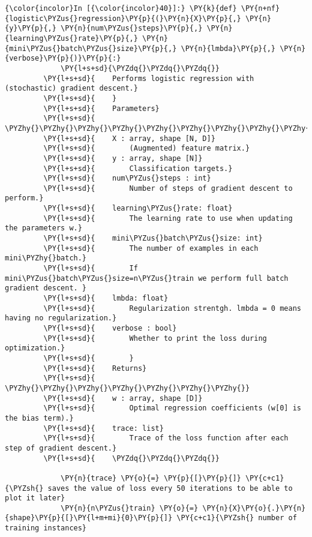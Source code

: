     \begin{Verbatim}[commandchars=\\\{\}]
{\color{incolor}In [{\color{incolor}40}]:} \PY{k}{def} \PY{n+nf}{logistic\PYZus{}regression}\PY{p}{(}\PY{n}{X}\PY{p}{,} \PY{n}{y}\PY{p}{,} \PY{n}{num\PYZus{}steps}\PY{p}{,} \PY{n}{learning\PYZus{}rate}\PY{p}{,} \PY{n}{mini\PYZus{}batch\PYZus{}size}\PY{p}{,} \PY{n}{lmbda}\PY{p}{,} \PY{n}{verbose}\PY{p}{)}\PY{p}{:}
             \PY{l+s+sd}{\PYZdq{}\PYZdq{}\PYZdq{}}
         \PY{l+s+sd}{    Performs logistic regression with (stochastic) gradient descent.}
         \PY{l+s+sd}{    }
         \PY{l+s+sd}{    Parameters}
         \PY{l+s+sd}{    \PYZhy{}\PYZhy{}\PYZhy{}\PYZhy{}\PYZhy{}\PYZhy{}\PYZhy{}\PYZhy{}\PYZhy{}\PYZhy{}}
         \PY{l+s+sd}{    X : array, shape [N, D]}
         \PY{l+s+sd}{        (Augmented) feature matrix.}
         \PY{l+s+sd}{    y : array, shape [N]}
         \PY{l+s+sd}{        Classification targets.}
         \PY{l+s+sd}{    num\PYZus{}steps : int}
         \PY{l+s+sd}{        Number of steps of gradient descent to perform.}
         \PY{l+s+sd}{    learning\PYZus{}rate: float}
         \PY{l+s+sd}{        The learning rate to use when updating the parameters w.}
         \PY{l+s+sd}{    mini\PYZus{}batch\PYZus{}size: int}
         \PY{l+s+sd}{        The number of examples in each mini\PYZhy{}batch.}
         \PY{l+s+sd}{        If mini\PYZus{}batch\PYZus{}size=n\PYZus{}train we perform full batch gradient descent. }
         \PY{l+s+sd}{    lmbda: float}
         \PY{l+s+sd}{        Regularization strentgh. lmbda = 0 means having no regularization.}
         \PY{l+s+sd}{    verbose : bool}
         \PY{l+s+sd}{        Whether to print the loss during optimization.}
         \PY{l+s+sd}{        }
         \PY{l+s+sd}{    Returns}
         \PY{l+s+sd}{    \PYZhy{}\PYZhy{}\PYZhy{}\PYZhy{}\PYZhy{}\PYZhy{}\PYZhy{}}
         \PY{l+s+sd}{    w : array, shape [D]}
         \PY{l+s+sd}{        Optimal regression coefficients (w[0] is the bias term).}
         \PY{l+s+sd}{    trace: list}
         \PY{l+s+sd}{        Trace of the loss function after each step of gradient descent.}
         \PY{l+s+sd}{    \PYZdq{}\PYZdq{}\PYZdq{}}
             
             \PY{n}{trace} \PY{o}{=} \PY{p}{[}\PY{p}{]} \PY{c+c1}{\PYZsh{} saves the value of loss every 50 iterations to be able to plot it later}
             \PY{n}{n\PYZus{}train} \PY{o}{=} \PY{n}{X}\PY{o}{.}\PY{n}{shape}\PY{p}{[}\PY{l+m+mi}{0}\PY{p}{]} \PY{c+c1}{\PYZsh{} number of training instances}
             

\end{Verbatim}
